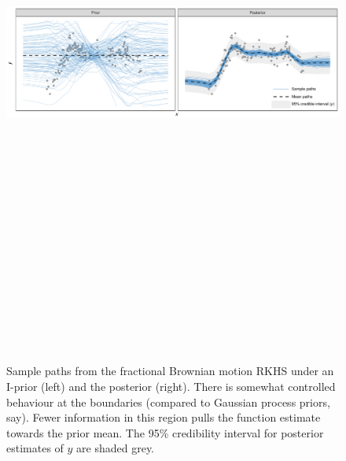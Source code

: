 \documentclass{beamer}
\newlength{\twocolwid}
\begin{document}
\begin{frame}[t]
\begin{columns}[t]
\begin{column}{\twocolwid}
\vspace{-1.8cm}
\begin{figure}
\includegraphics[width=\linewidth, height=20cm]{figure/iprior_function}
\vspace{-1.8cm}
\caption{Sample paths from the fractional Brownian motion RKHS under an I-prior (left) and the posterior (right). There is somewhat controlled behaviour at the boundaries (compared to Gaussian process priors, say). Fewer information in this region pulls the function estimate towards the prior mean. The 95\% credibility interval for posterior estimates of $y$ are shaded grey.}
\end{figure}




\end{column}
\end{columns}
\end{frame}
\end{document}
